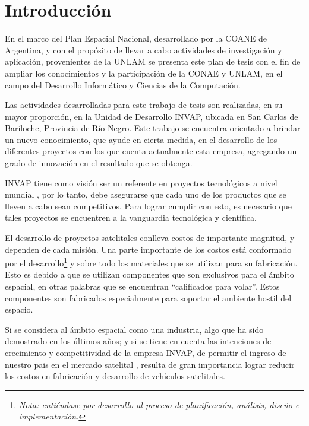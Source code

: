 \chapter{Introducción}\label{chap:intro}
En el marco del Plan Espacial Nacional, desarrollado por la \ac{COANE} de Argentina, y con el propósito de llevar a cabo actividades de investigación y 
aplicación, provenientes de la \ac{UNLAM} se presenta este plan de tesis con el fin de ampliar los 
conocimientos y la participación de la \ac{CONAE} y \ac{UNLAM}, en el campo del Desarrollo Informático y 
Ciencias de la Computación.

Las actividades desarrolladas para este trabajo de tesis son realizadas, en su mayor proporción, en 
la Unidad de Desarrollo \ac{INVAP}, ubicada en San Carlos de Bariloche, Provincia de Río Negro. Este 
trabajo se encuentra orientado a brindar un nuevo conocimiento, que ayude en cierta medida, en el 
desarrollo de los diferentes proyectos con los que cuenta actualmente esta empresa, agregando un 
grado de innovación en el resultado que se obtenga.

\ac{INVAP} tiene como visión ser un referente en proyectos tecnológicos a nivel mundial \cite{invapWEB}, 
por lo tanto, debe asegurarse que cada uno de los productos que se lleven a cabo sean competitivos. 
Para lograr cumplir con esto, es necesario que tales proyectos se encuentren a la vanguardia 
tecnológica y científica.  

El desarrollo de proyectos satelitales conlleva costos de importante magnitud, y 
dependen de cada misión. Una parte importante de los costos está conformado por el 
desarrollo\footnote{\textit{Nota: entiéndase por desarrollo al proceso de planificación, análisis, 
diseño e implementación.}} y sobre todo los materiales que se utilizan para su fabricación. Esto 
es debido a que se utilizan componentes que son exclusivos para el ámbito espacial, en otras 
palabras que se encuentran ``calificados para volar''. Estos componentes son fabricados especialmente para soportar el ambiente hostil del espacio.

Si se considera al ámbito espacial como una industria, algo que ha sido demostrado en los últimos 
años; y si se tiene en cuenta las intenciones de crecimiento y competitividad de la empresa INVAP,  de permitir el ingreso de nuestro pais en el mercado satelital \cite{invapWEB}, resulta de gran 
importancia lograr reducir los costos en fabricación y desarrollo de vehículos satelitales.

